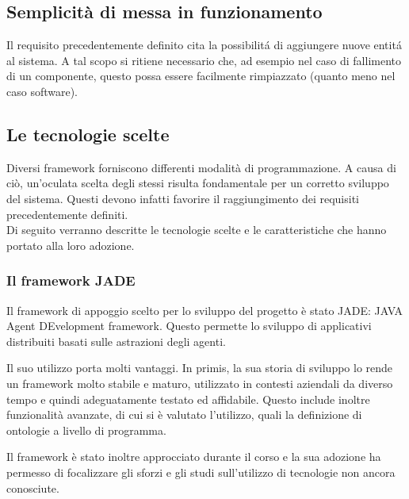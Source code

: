\subsection{Semplicità di messa in funzionamento}
Il requisito precedentemente definito cita la possibilit\'a di aggiungere nuove entit\'a al sistema. A tal scopo si ritiene necessario che, ad esempio nel caso di fallimento di un componente, questo possa essere facilmente rimpiazzato (quanto meno nel caso software).


\subsection{Le tecnologie scelte}
Diversi framework forniscono differenti modalità di programmazione. A causa di ciò, un'oculata scelta degli stessi risulta fondamentale per un corretto sviluppo del sistema. Questi devono infatti favorire il raggiungimento dei requisiti precedentemente definiti.\\
Di seguito verranno descritte le tecnologie scelte e le caratteristiche che hanno portato alla loro adozione.

\subsubsection{Il framework JADE}
Il framework di appoggio scelto per lo sviluppo del progetto è stato JADE: JAVA Agent DEvelopment framework. Questo permette lo sviluppo di applicativi distribuiti basati sulle astrazioni degli agenti.

Il suo utilizzo porta molti vantaggi. In primis, la sua storia di sviluppo lo rende un framework molto stabile e maturo, utilizzato in contesti aziendali da diverso tempo e quindi adeguatamente testato ed affidabile. Questo include inoltre funzionalità avanzate, di cui si è valutato l'utilizzo, quali la definizione di ontologie a livello di programma.

Il framework è stato inoltre approcciato durante il corso e la sua adozione ha permesso di focalizzare gli sforzi e gli studi sull'utilizzo di tecnologie non ancora conosciute.

